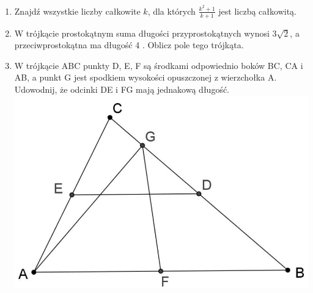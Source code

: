 \documentclass[10pt]{article}
\begin{document}
\begin{enumerate}
  \item Znajdź wszystkie liczby całkowite \(k\), dla których \(\frac{k^{2}+1}{k+1}\) jest liczbą całkowitą.
  \item W trójkącie prostokątnym suma długości przyprostokątnych wynosi \(3 \sqrt{2}\), a przeciwprostokątna ma długość 4 . Oblicz pole tego trójkąta.
  \item W trójkącie ABC punkty D, E, F są środkami odpowiednio boków BC, CA i AB, a punkt G jest spodkiem wysokości opuszczonej z wierzchołka A. Udowodnij, że odcinki DE i FG mają jednakową długość.\\
\includegraphics[max width=\textwidth, center]{2024_11_21_eb28af2003ece22058c4g-1}
\end{enumerate}
\end{document}
